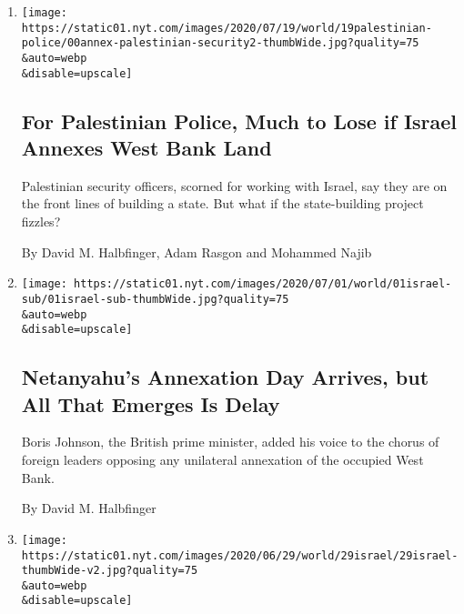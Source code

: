 \begin{enumerate}
\def\labelenumi{\arabic{enumi}.}
\item
  \href{/2020/07/22/world/middleeast/palestinian-police-annex-israel.html}{}

  \texttt{[image: https://static01.nyt.com/images/2020/07/19/world/19palestinian-police/00annex-palestinian-security2-thumbWide.jpg?quality=75\\\&auto=webp\\\&disable=upscale]}

  \hypertarget{for-palestinian-police-much-to-lose-if-israel-annexes-west-bank-land}{%
  \subsection{For Palestinian Police, Much to Lose if Israel Annexes
  West Bank
  Land}\label{for-palestinian-police-much-to-lose-if-israel-annexes-west-bank-land}}

  Palestinian security officers, scorned for working with Israel, say
  they are on the front lines of building a state. But what if the
  state-building project fizzles?

  By David M. Halbfinger, Adam Rasgon and Mohammed Najib
\item
  \href{/2020/07/01/world/middleeast/israel-annexation-netanyahu-johnson.html}{}

  \texttt{[image: https://static01.nyt.com/images/2020/07/01/world/01israel-sub/01israel-sub-thumbWide.jpg?quality=75\\\&auto=webp\\\&disable=upscale]}

  \hypertarget{netanyahus-annexation-day-arrives-but-all-that-emerges-is-delay}{%
  \subsection{Netanyahu's Annexation Day Arrives, but All That Emerges
  Is
  Delay}\label{netanyahus-annexation-day-arrives-but-all-that-emerges-is-delay}}

  Boris Johnson, the British prime minister, added his voice to the
  chorus of foreign leaders opposing any unilateral annexation of the
  occupied West Bank.

  By David M. Halbfinger
\item
  \href{/2020/06/29/world/middleeast/israel-ambassador-residence-sale.html}{}

  \texttt{[image: https://static01.nyt.com/images/2020/06/29/world/29israel/29israel-thumbWide-v2.jpg?quality=75\\\&auto=webp\\\&disable=upscale]}

  \hypertarget{5-brs-poolhot-tub-mediterranean-vu-too-far-to-commute-to-jerusalem}{%
}
\end{enumerate}
